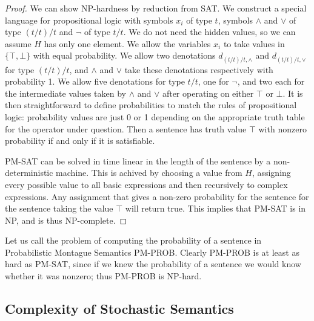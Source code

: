 \documentclass[11pt]{article}
\theoremstyle{definition}
\begin{document}
\begin{proof}
We can show NP-hardness by reduction from SAT. We construct a special
language for propositional logic with symbols $x_i$ of type $t$,
symbols $\land$ and $\lor$ of type $(t/t)/t$ and $\lnot$ of type
$t/t$. We do not need the hidden values, so we can assume $H$ has only
one element. We allow the variables $x_i$ to take values in $\{\top, \bot\}$
with equal probability. We allow two denotations $d_{(t/t)/t, \land}$
and $d_{(t/t)/t, \lor}$ for type $(t/t)/t$, and $\land$ and $\lor$
take these denotations respectively with probability 1. We allow five
denotations for type $t/t$, one for $\lnot$, and two each for the
intermediate values taken by $\land$ and $\lor$ after operating on
either $\top$ or $\bot$. It is then straightforward to define
probabilities to match the rules of propositional logic: probability
values are just 0 or 1 depending on the appropriate truth table for
the operator under question. Then a sentence has truth value $\top$
with nonzero probability if and only if it is satisfiable.

PM-SAT can be solved in time linear in the length of the sentence by a non-deterministic machine. This is achived by
choosing a value from $H$, assigning every possible value to all basic
expressions and then recursively to complex expressions. Any
assignment that gives a non-zero probability for the sentence for the
sentence taking the value $\top$ will return true. This implies that
PM-SAT is in NP, and is thus NP-complete.
\end{proof}

Let us call the problem of computing the probability of a sentence in
Probabilistic Montague Semantics PM-PROB. Clearly PM-PROB is at least
as hard as PM-SAT, since if we knew the probability of a sentence we
would know whether it was nonzero; thus PM-PROB is NP-hard.

\subsection{Complexity of Stochastic Semantics}
\end{document}

